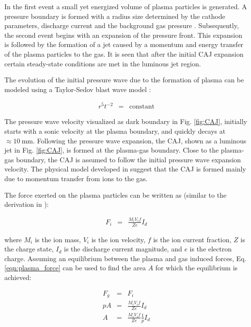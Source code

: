 \documentclass[a4paper]{iacas}%
\begin{document}
In the first event a small yet energized volume of plasma particles is generated. A pressure boundary is formed with a radius size determined by the cathode parameters, discharge current and the background gas pressure \cite{boxman1990momentum}.
Subsequently, the second event begins with an expansion of the pressure front. This expansion is followed by the formation of a jet caused by a momentum and energy transfer of the plasma particles to the gas. It is seen that after the initial CAJ expansion certain steady-state conditions are met in the luminous jet region. 

The evolution of the initial pressure wave due to the formation of plasma can be modeled using a Taylor-Sedov blast wave model \cite{TAYLOR,SEDOV}: 

\begin{eqnarray}\label{eqn:taylor_sedov}
r^5 t^{-2} &=& \mathrm{constant}
\end{eqnarray}

\noindent The pressure wave velocity visualized as dark boundary in Fig. \ref{fig:CAJ}, initially starts with a sonic velocity at the plasma boundary, and quickly decays at $\approx 10~\mathrm{mm}$. Following the pressure wave expansion, the CAJ, shown as a luminous jet in Fig. \ref{fig:CAJ}, is formed at the plasma-gas boundary. Close to the plasma-gas boundary, the CAJ is assumed to follow the initial pressure wave expansion velocity. The physical model developed in \cite{KRClose} suggest that the CAJ is formed mainly due to momentum transfer from ions to the gas.


The force exerted on the plasma particles can be written as (similar to the derivation in \cite{boxman1990momentum}):

\begin{eqnarray}\label{eqn:plasma_force}
	F_i &= &\frac{M_i V_i f}{Z e} I_d
\end{eqnarray}

\noindent where $M_i$ is the ion mass, $V_i$ is the ion velocity, $f$ is the ion current fraction, $Z$ is the charge state, $I_d$ is the discharge current magnitude, and $e$ is the electron charge.
Assuming an equilibrium between the plasma and gas induced forces, Eq. \eqref{eqn:plasma_force} can be used to find the area $A$ for which the equilibrium is achieved:

\begin{eqnarray}\label{eqn:rel_equiv_force}
	F_g & = & F_i \\
	p A & = & \frac{M_i V_i f}{Z e} I_d\\
	A & = & \frac{M_i V_i f}{Z e} \frac{1}{p} I_d
\end{eqnarray}
\end{document}
